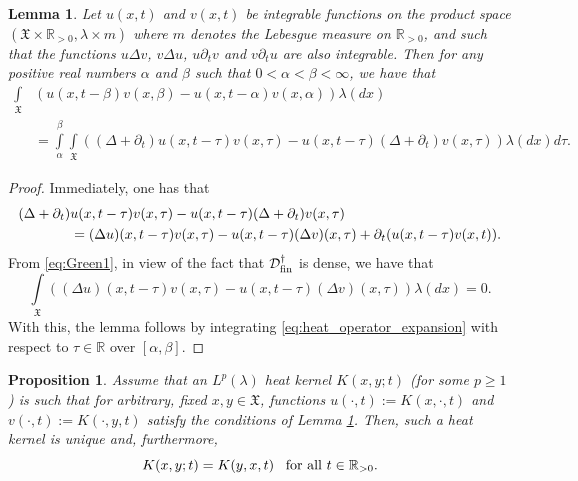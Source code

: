 \documentclass[11pt,reqno]{amsart}
\newtheorem{lemma}[theorem]{Lemma}
\newtheorem{proposition}[theorem]{Proposition}
\theoremstyle{remark}
\theoremstyle{definition}
\numberwithin{theorem}{section} \numberwithin{equation}{section}
\newcommand{\R}{\mathbb{R}}
\newcommand{\X}{\mathfrak{X}}
\begin{document}
\begin{lemma} \label{lem:Duhamel}
Let $u(x,t)$ and $v(x,t)$ be integrable functions on the product space $(\X \times \mathbb{R}_{>0}, \lambda\times m)$ where $m$ denotes the Lebesgue measure on $\mathbb{R}_{>0}$, and such
that the functions $u\Delta v$, $v\Delta u$, $u\partial_{t}v$ and $v\partial_{t}u$ are also integrable.
Then for any positive real numbers $\alpha$ and $\beta$ such that $0 < \alpha < \beta <\infty$, we have that
\begin{align*}
\int\limits_{\X}&\left(u(x,t-\beta)v(x,\beta) - u(x,t-\alpha)v(x,\alpha)\right)\lambda(dx)
\\&=\int\limits_{\alpha}^{\beta}\int\limits_{\X}
\left((\Delta + \partial_{t})u(x,t-\tau)v(x,\tau) - u(x,t-\tau)(\Delta + \partial_{t})v(x,\tau)\right)\lambda(dx)d\tau.
\end{align*}
\end{lemma}

\begin{proof}
Immediately, one has that
\begin{align}\label{eq:heat_operator_expansion}\notag
(\Delta + \partial_{t})&u(x,t-\tau)v(x,\tau) - u(x,t-\tau)(\Delta + \partial_{t})v(x,\tau)
\\&= (\Delta u)(x,t-\tau)v(x,\tau)  - u(x,t-\tau)(\Delta v)(x,\tau)
+ \partial_{t} (u(x,t-\tau)v(x,t)).
\end{align}
From \eqref{eq:Green1}, in view of the fact that $\mathcal{D}_{\rm fin}^\dagger$ is dense,
we have that
$$
\int\limits_{\X}\left((\Delta u)(x,t-\tau)v(x,\tau) - u(x,t-\tau)(\Delta v)(x,\tau)\right)\lambda(dx) = 0.
$$
With this, the lemma follows by integrating \eqref{eq:heat_operator_expansion} with respect to
$\tau \in \R$ over $[\alpha, \beta]$.
\end{proof}

\begin{proposition} \label{thm:uniqueness}
Assume that an $L^p(\lambda)$ heat kernel $K(x,y;t)$ (for some $p\geq 1$) is such that for arbitrary, fixed $x,y\in\X$, functions $u(\cdot,t):=K(x,\cdot, t)$ and $v(\cdot,t):=K(\cdot, y, t)$ satisfy
the conditions of Lemma \ref{lem:Duhamel}.  Then, such a heat kernel is unique and, furthermore,
$$
K(x,y;t) = K(y,x,t)
\,\,\,\,\,
\text{\rm for all $t \in \mathbb{R}_{>0}$.}
$$
\end{proposition}
\end{document}
